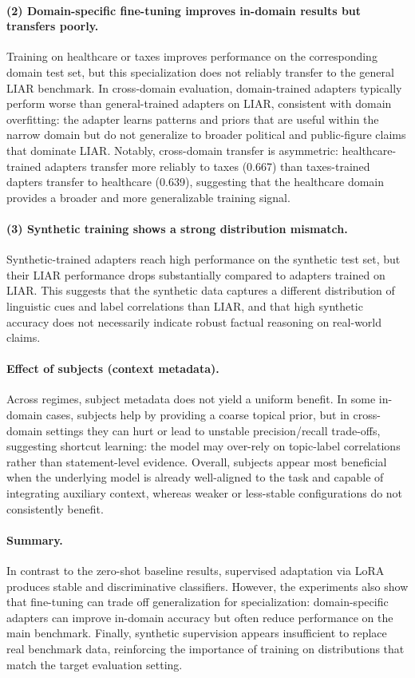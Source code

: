 \paragraph{(2) Domain-specific fine-tuning improves in-domain results but transfers poorly.}
Training on healthcare or taxes improves performance on the corresponding domain test set, but this specialization does not reliably transfer to the general LIAR benchmark. In cross-domain evaluation, domain-trained adapters typically perform 
worse than general-trained adapters on LIAR, consistent with domain overfitting: the adapter learns patterns and priors that are useful within the narrow domain but do not generalize to broader political and public-figure claims that dominate LIAR. Notably, cross-domain transfer is asymmetric: healthcare-trained adapters transfer more reliably to taxes (0.667) than taxes-trained dapters transfer to healthcare (0.639), suggesting that the healthcare domain provides a broader and more generalizable training signal.

\paragraph{(3) Synthetic training shows a strong distribution mismatch.}
Synthetic-trained adapters reach high performance on the synthetic test set, but their LIAR performance drops substantially compared to adapters trained on LIAR. This suggests that the synthetic data captures a different distribution of linguistic cues and label correlations than LIAR, and that high synthetic accuracy does not necessarily indicate robust factual reasoning on real-world claims.

\paragraph{Effect of subjects (context metadata).}
Across regimes, subject metadata does not yield a uniform benefit. In some in-domain cases, subjects help by providing a coarse topical prior, but in cross-domain settings they can hurt or lead to unstable precision/recall trade-offs, suggesting shortcut learning: the model may over-rely on topic-label correlations rather than statement-level evidence. Overall, subjects appear most beneficial when the underlying model is already well-aligned to the task and capable of integrating auxiliary context, whereas weaker or less-stable configurations do not consistently benefit.

\paragraph{Summary.}
In contrast to the zero-shot baseline results, supervised adaptation via LoRA produces stable and discriminative classifiers. However, the experiments also show that fine-tuning can trade off generalization for specialization: domain-specific adapters can improve in-domain accuracy but often reduce performance on the main benchmark. Finally, synthetic supervision appears insufficient to replace real benchmark data, reinforcing the importance of training on distributions that match the target evaluation setting.

